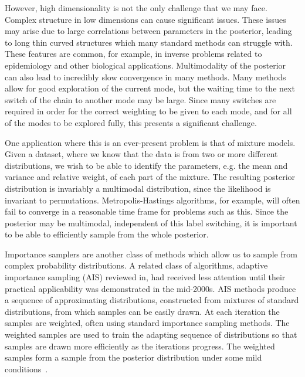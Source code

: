 \documentclass[final]{siamltex}
\begin{document}
However, high dimensionality is not the only challenge that we may
face. Complex structure in low
dimensions can cause significant issues. These issues may arise due to
large correlations between parameters in the posterior, leading to
long thin curved structures which many standard methods can struggle
with. These features are common, for example, in inverse problems
related to epidemiology and
other biological applications\cite{house2016bayesian}. Multimodality of the posterior can also lead to
incredibly slow convergence in many methods. Many methods allow for
good exploration of the current mode, but the waiting time to the next
switch of the chain to another mode may be large. Since many switches
are required in order for the correct weighting to be given to each
mode, and for all of the modes to be explored fully, this presents a
significant challenge.

One application where this is an ever-present problem is that of
mixture models. Given a dataset, where we know that the data is from
two or more different distributions, we wish to be able to identify
the parameters, e.g. the mean and variance and relative weight, of
each part of the mixture\cite{marin2005bayesian}. The resulting posterior
distribution is invariably a multimodal distribution, since the likelihood is
invariant to permutations. Metropolis-Hastings algorithms, for
example, will often fail to converge in a reasonable time frame for
problems such as this. Since the posterior may be multimodal,
independent of this label switching, it is important to be able
to efficiently sample from the whole posterior.

Importance samplers are another class of methods which allow
us to sample from complex probability distributions. A related class of algorithms, adaptive importance sampling (AIS)
\cite{liu2008monte} reviewed in\cite{bugallo2015adaptive}, had
received less attention until their practical applicability was
demonstrated in the
mid-2000s\cite{celeux2006iterated,cappepopulation,isard1998condensation,bink2008bayesian}.
AIS methods produce a sequence of approximating distributions,
constructed from mixtures of standard distributions, from which samples can be
easily drawn. At each iteration the samples are weighted, often using
standard importance sampling methods. The weighted samples are used to
train the adapting sequence of distributions so that samples are drawn
more efficiently as the iterations progress. The weighted samples form
a sample from the posterior distribution under some mild
conditions~\cite{robert2013monte,martino2015adaptive}.
\end{document}
